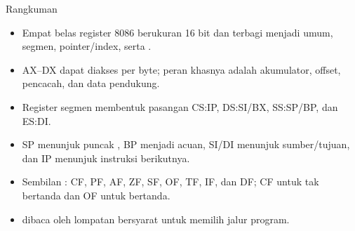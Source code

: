 \documentclass[aspectratio=169,11pt]{beamer}
\begin{document}
\begin{frame}{Rangkuman}
\small
\begin{itemize}
    \item Empat belas register 8086 berukuran 16 bit dan terbagi
          menjadi umum, segmen, pointer/index, serta .

    \vspace{0.15em}
    \item AX--DX dapat diakses per byte; peran khasnya adalah
          akumulator, offset, pencacah, dan data pendukung.

    \vspace{0.15em}
    \item Register segmen membentuk pasangan CS:IP, DS:SI/BX,
          SS:SP/BP, dan ES:DI.

    \vspace{0.15em}
    \item SP menunjuk puncak , BP menjadi acuan, SI/DI
          menunjuk sumber/tujuan, dan IP menunjuk instruksi
          berikutnya.

    \vspace{0.15em}
    \item Sembilan : CF, PF, AF, ZF, SF, OF, TF, IF, dan
          DF; CF untuk tak bertanda dan OF untuk bertanda.

    \vspace{0.15em}
    \item {} dibaca oleh lompatan bersyarat untuk memilih
          jalur program.
\end{itemize}
\end{frame}
\end{document}

